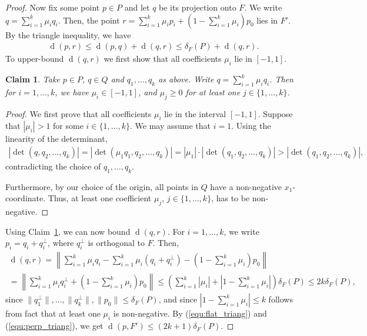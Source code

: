 \documentclass[a4paper,11pt]{paper}
\DeclareMathOperator{\dist}{d}
\newtheorem{claim}[theorem]{Claim}
\begin{document}
\begin{proof}
  Now fix some point $p \in P$ and let $q$ be its projection onto
  $F$. We write $q = \sum_{i=1}^{k} \mu_i q_i$. Then, the point
  $r = \sum_{i=1}^{k} \mu_i p_i + (1-\sum_{i=1}^{k} \mu_i) p_0$
  lies in $F'$. By the triangle inequality, we have
  \begin{align}\label{equ:flat_triang}
    \dist(p, r) \leq \dist(p, q) + \dist(q, r) \leq \delta_F(P) +
      \dist(q, r).
  \end{align}
  To upper-bound $\dist(q, r)$ we first show that all coefficients
  $\mu_i$ lie in $[-1, 1]$.
  \begin{claim}\label{clm:coeffbound}
    Take $p\in P$, $q \in Q$  and $q_1, \dots, q_{k}$
    as above. Write $q = \sum_{i=1}^{k} \mu_i q_i$. Then for
    $i = 1, \dots, k$, we have $\mu_i \in [-1, 1]$, and
    $\mu_j \geq 0$ for at least one  $j\in\{1, \dots, k\}$.
  \end{claim}
  \begin{proof}
    We first prove that all coefficients $\mu_i$ lie in the
    interval $[-1,1]$. Suppose that $|\mu_i| > 1$ for some
    $i \in \{1, \dots, k\}$. We may assume that $i = 1$.
    Using the linearity of the determinant,
    \begin{multline*}
      |\det(q, q_2, \dots, q_k)| = |\det(\mu_1 q_1, q_2, \dots, q_k)|
      = |\mu_1| \cdot |\det(q_1, q_2, \dots, q_k)|
      > |\det(q_1, q_2, \dots, q_k)|,
    \end{multline*}
     contradicting the choice of $q_1, \dots, q_k$.

     Furthermore, by our choice of the origin,
     all points in $Q$ have a non-negative
     $x_1$-coordinate.
     Thus, at least one coefficient $\mu_j$, $j\in\{1, \dots, k\}$,
     has to be non-negative.
  \end{proof}
  Using Claim~\ref{clm:coeffbound}, we can now bound $\dist(q, r)$.
  For $i = 1, \dots, k$, we write
  $p_i = q_i + q_i^{\perp}$, where $q_i^{\perp}$ is orthogonal to $F$.
  Then,
  \begin{multline}\label{equ:perp_triang}
    \dist(q, r) =
    \left\|\sum_{i = 1}^k \mu_i q_i -
        \sum_{i = 1}^{k} \mu_i (q_i + q_i^\perp) -
        \left(1 - \sum_{i =1 }^{k} \mu_i\right)
        p_0\right\| \\
      =\left\| \sum_{i=1}^{k} \mu_i q_i^{\perp} +
      \left(1-\sum_{i=1}^{k} \mu_i\right) p_0 \right\|
    \leq \left(\sum_{i=1}^{k} |\mu_i| +
      \left|1 - \sum_{i=1}^{k} \mu_i\right|
    \right) \delta_F(P) \leq 2k \delta_F(P),
  \end{multline}
  since
  $\|q_1^\perp\|, \dots, \|q_k^\perp\|, \|p_0\| \leq \delta_F(P)$,
  and since $\left|1-\sum_{i=1}^{k} \mu_i\right| \leq k$ follows from
  fact that at least one $\mu_i$ is non-negative.
  By (\ref{equ:flat_triang}) and (\ref{equ:perp_triang}), we get
  $\dist(p, F') \leq (2k+1) \delta_F(P)$.
\end{proof}
\end{document}
